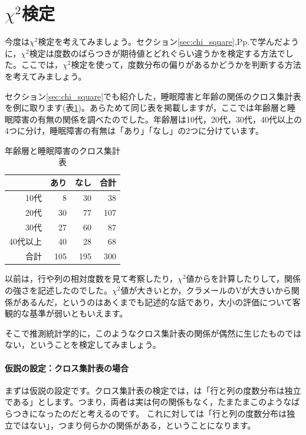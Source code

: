 \documentclass{ltjsbook}
\begin{document}
\section{$\chi^2$検定}

今度は$\chi^2$検定を考えてみましょう。セクション\ref{sec:chi_square},Pp.\pageref{sec:chi_square}で学んだように，$\chi^2$検定は度数のばらつきが期待値とどれぐらい違うかを検定する方法でした。ここでは，$\chi^2$検定を使って，度数分布の偏りがあるかどうかを判断する方法を考えてみましょう。

セクション\ref{sec:chi_square}でも紹介した，睡眠障害と年齢の関係のクロス集計表を例に取ります(表\ref{tbl:13_01})。あらためて同じ表を掲載しますが，ここでは年齢層と睡眠障害の有無の関係を調べたのでした。年齢層は10代，20代，30代，40代以上の4つに分け，睡眠障害の有無は「あり」「なし」の2つに分けています。
\begin{table}[ht]
\centering
\caption{年齢層と睡眠障害のクロス集計表} 
\begin{tabular}{rrrr}
  \hline
 & あり & なし & 合計 \\ 
  \hline
10代 & 8 & 30 & 38 \\ 
  20代 & 30 & 77 & 107 \\ 
  30代 & 27 & 60 & 87 \\ 
  40代以上 & 40 & 28 & 68 \\ 
  合計 & 105 & 195 & 300 \\ 
   \hline
\end{tabular}
\label{tbl:13_01}
\end{table}

以前は，行や列の相対度数を見て考察したり，$\chi^2$値からを計算したりして，関係の強さを記述したのでした。$\chi^2$値が大きいとか，クラメールのVが大きいから関係があるんだ，というのはあくまでも記述的な話であり，大小の評価について客観的な基準が弱いともいえます。

そこで推測統計学的に，このようなクロス集計表の関係が偶然に生じたものではない，ということを検定してみましょう。

\paragraph{仮説の設定：クロス集計表の場合}
まずは仮説の設定です。クロス集計表の検定では，は「行と列の度数分布は独立である」とします。つまり，両者は実は何の関係もなく，たまたまこのようなばらつきになったのだと考えるのです。
これに対しては「行と列の度数分布は独立ではない」，つまり何らかの関係がある，ということになります。
\end{document}
